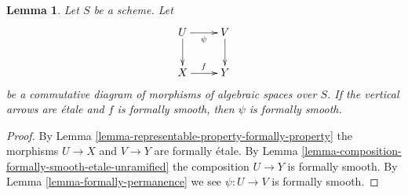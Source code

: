 \documentclass[10pt,a4paper]{amsart}
\theoremstyle{plain}
\newtheorem{lemma}[subsection]{Lemma}
\theoremstyle{definition}
\theoremstyle{remark}
\numberwithin{equation}{subsection}
\begin{document}
\begin{lemma}
\label{lemma-helper-formally-smooth}
Let $S$ be a scheme. Let
$$
\xymatrix{
U \ar[d] \ar[r]_\psi & V \ar[d] \\
X \ar[r]^f & Y
}
$$
be a commutative diagram of morphisms of algebraic spaces over $S$.
If the vertical arrows are \'etale and $f$ is formally smooth, then
$\psi$ is formally smooth.
\end{lemma}

\begin{proof}
By
Lemma \ref{lemma-representable-property-formally-property}
the morphisms $U \to X$ and $V \to Y$ are formally \'etale. By
Lemma \ref{lemma-composition-formally-smooth-etale-unramified}
the composition $U \to Y$ is formally smooth. By
Lemma \ref{lemma-formally-permanence}
we see $\psi : U \to V$ is formally smooth.
\end{proof}
\end{document}
